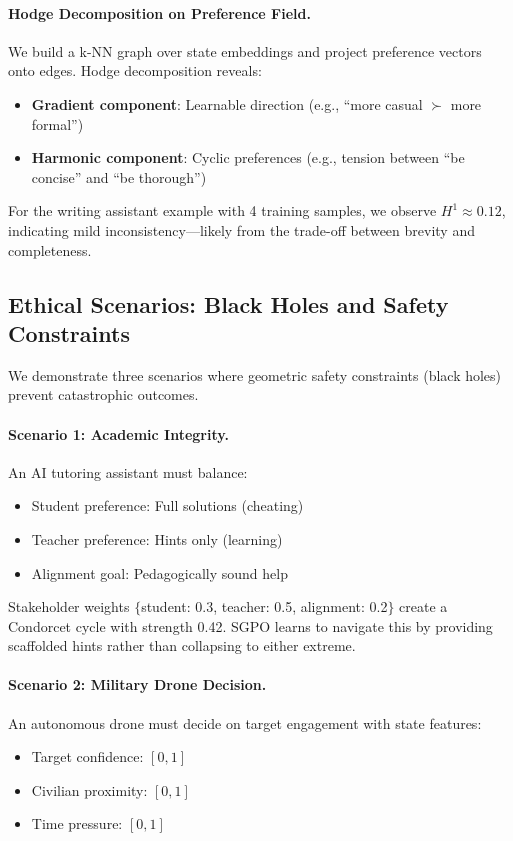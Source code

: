 \paragraph{Hodge Decomposition on Preference Field.}
We build a k-NN graph over state embeddings and project preference vectors onto edges. Hodge decomposition reveals:
\begin{itemize}
    \item \textbf{Gradient component}: Learnable direction (e.g., ``more casual $\succ$ more formal'')
    \item \textbf{Harmonic component}: Cyclic preferences (e.g., tension between ``be concise'' and ``be thorough'')
\end{itemize}

For the writing assistant example with 4 training samples, we observe $H^1 \approx 0.12$, indicating mild inconsistency---likely from the trade-off between brevity and completeness.

\subsection{Ethical Scenarios: Black Holes and Safety Constraints}

We demonstrate three scenarios where geometric safety constraints (black holes) prevent catastrophic outcomes.

\paragraph{Scenario 1: Academic Integrity.}
An AI tutoring assistant must balance:
\begin{itemize}
    \item Student preference: Full solutions (cheating)
    \item Teacher preference: Hints only (learning)
    \item Alignment goal: Pedagogically sound help
\end{itemize}

Stakeholder weights $\{$student: 0.3, teacher: 0.5, alignment: 0.2$\}$ create a Condorcet cycle with strength 0.42. SGPO learns to navigate this by providing scaffolded hints rather than collapsing to either extreme.

\paragraph{Scenario 2: Military Drone Decision.}
An autonomous drone must decide on target engagement with state features:
\begin{itemize}
    \item Target confidence: $[0, 1]$
    \item Civilian proximity: $[0, 1]$
    \item Time pressure: $[0, 1]$
\end{itemize}

